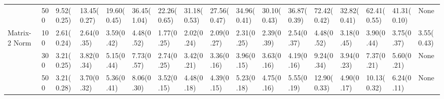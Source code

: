 \begin{table}[H]
{\begin{tabular}{ll|p{2cm}p{2cm}p{2cm}p{2cm}p{2cm}p{2cm}p{2cm}p{2cm}p{2cm}p{2cm}p{2cm}p{2cm}p{2cm}p{2cm}p{2cm}}
              & 500 &                        9.52(0.25) &                         13.45(0.27) &                         19.60(0.45) &                         36.45(1.04) &                                           22.26(0.65) &                                             31.18(0.53) &                                             27.56(0.47) &                                               34.96(0.41) &                                             30.10(0.43) &                                               36.87(0.39) &  72.42(0.42) &    32.82(0.41) &    62.41(0.55) &   41.31(0.10) &             None \\
Matrix-2 Norm & 100 &                        2.61(0.24) &                          2.64(0.35) &                          3.59(0.42) &                          4.48(0.52) &                                            1.77(0.25) &                                              2.02(0.24) &                                              2.09(0.27) &                                                2.31(0.25) &                                              2.39(0.39) &                                                2.54(0.37) &   4.48(0.52) &     3.18(0.45) &     3.90(0.44) &    3.75(0.37) &       3.55(0.43) \\
              & 300 &                        3.21(0.25) &                          3.82(0.34) &                          5.15(0.44) &                          7.73(0.57) &                                            2.74(0.25) &                                              3.42(0.21) &                                              3.36(0.16) &                                                3.96(0.15) &                                              3.63(0.16) &                                                4.19(0.16) &   9.24(0.34) &     3.94(0.23) &     7.37(0.21) &    5.60(0.21) &             None \\
              & 500 &                        3.21(0.28) &                          3.70(0.32) &                          5.36(0.41) &                          8.06(0.30) &                                            3.52(0.15) &                                              4.48(0.18) &                                              4.39(0.15) &                                                5.23(0.18) &                                              4.75(0.16) &                                                5.55(0.19) &  12.90(0.33) &     4.90(0.17) &    10.13(0.32) &    6.24(0.11) &             None \\
\bottomrule
\end{tabular}
}
\end{table}
